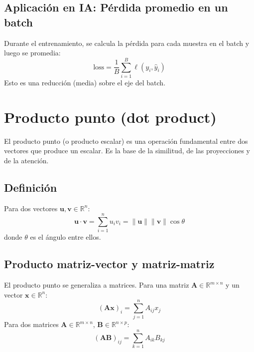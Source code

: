 \documentclass[12pt,a4paper,openany,oneside]{book}
\begin{document}
\begin{center}
\end{center}

\subsection{Aplicación en IA: Pérdida promedio en un batch}
Durante el entrenamiento, se calcula la pérdida para cada muestra en el batch y luego se promedia:
\begin{equation*}
\text{loss} = \frac{1}{B} \sum_{i=1}^{B} \ell(y_i, \hat{y}_i)
\end{equation*}
Esto es una reducción (media) sobre el eje del batch.

\section{Producto punto (dot product)}

El producto punto (o producto escalar) es una operación fundamental entre dos vectores que produce un escalar. Es la base de la similitud, de las proyecciones y de la atención.

\subsection{Definición}
Para dos vectores $\mathbf{u}, \mathbf{v} \in \mathbb{R}^n$:
\begin{equation*}
\mathbf{u} \cdot \mathbf{v} = \sum_{i=1}^{n} u_i v_i = \|\mathbf{u}\| \|\mathbf{v}\| \cos \theta
\end{equation*}
donde $\theta$ es el ángulo entre ellos.

\subsection{Producto matriz-vector y matriz-matriz}
El producto punto se generaliza a matrices. Para una matriz $\mathbf{A} \in \mathbb{R}^{m \times n}$ y un vector $\mathbf{x} \in \mathbb{R}^n$:
\begin{equation*}
(\mathbf{A} \mathbf{x})_i = \sum_{j=1}^{n} A_{ij} x_j
\end{equation*}
Para dos matrices $\mathbf{A} \in \mathbb{R}^{m \times n}$, $\mathbf{B} \in \mathbb{R}^{n \times p}$:
\begin{equation*}
(\mathbf{A} \mathbf{B})_{ij} = \sum_{k=1}^{n} A_{ik} B_{kj}
\end{equation*}
\end{document}
